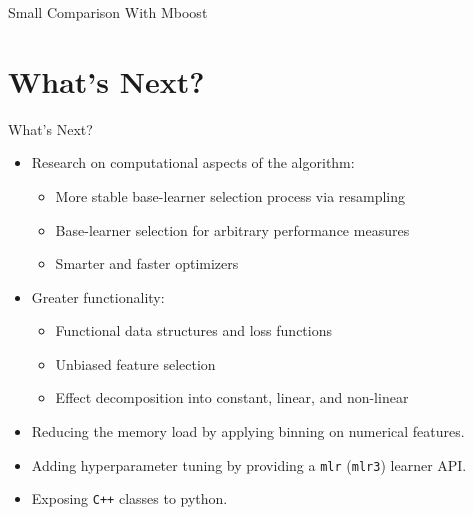 \documentclass[10pt]{beamer}\usepackage[]{graphicx}\usepackage[]{color}
\begin{document}
\begin{frame}{Small Comparison With Mboost}
\end{frame}


\section{What's Next?}

\begin{frame}{What's Next?}

\begin{itemize}
  \item
    Research on computational aspects of the algorithm:
    \begin{itemize}
      \item
        More stable base-learner selection process via resampling
      \item
        Base-learner selection for arbitrary performance measures
      \item
        Smarter and faster optimizers
    \end{itemize}

  \item
    Greater functionality:
    \begin{itemize}
      \item
        Functional data structures and loss functions
      \item
        Unbiased feature selection
      \item
        Effect decomposition into constant, linear, and non-linear
    \end{itemize}

    \item
      Reducing the memory load by applying binning on numerical features.

    \item
      Adding hyperparameter tuning by providing a \texttt{mlr} (\texttt{mlr3}) learner API.

    \item
      Exposing \texttt{C++} classes to python.
\end{itemize}

\end{frame}

\end{document}
